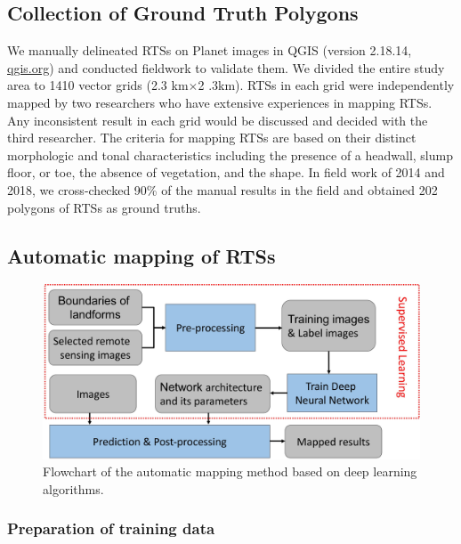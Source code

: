 \documentclass[preprint,12pt,authoryear]{elsarticle}
\begin{document}
\subsection{Collection of Ground Truth Polygons}
\label{subsec_collect_groundtruth}

We manually delineated RTSs on Planet images in QGIS (version 2.18.14, \url{qgis.org}) and conducted fieldwork to validate them. We divided the entire study area to 1410 vector grids (2.3 km$\times$2 .3km). RTSs in each grid were independently mapped by two researchers who have extensive experiences in mapping RTSs. Any inconsistent result in each grid would be discussed and decided with the third researcher. The criteria for mapping RTSs are based on their distinct morphologic and tonal characteristics including the presence of a headwall, slump floor, or toe, the absence of vegetation, and the shape. In field work of 2014 and 2018, we cross-checked 90\% of the manual results in the field and obtained 202 polygons of RTSs as ground truths.     

\subsection{Automatic mapping of RTSs}
\label{subsec_auto_mapping}

\begin{figure}[ht]
	\centering
	\includegraphics[width=12cm]{figures/flowchart_trim.jpg}
	\caption{Flowchart of the automatic mapping method based on deep learning algorithms.}
	\label{fig_flowchart}
\end{figure}

\subsubsection{Preparation of training data}
\label{subsubsec_pre_trainingdata}
\end{document}
